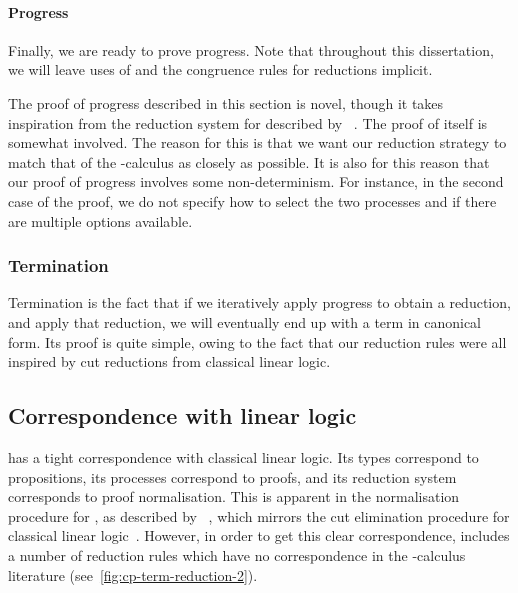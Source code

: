 \paragraph{Progress}
Finally, we are ready to prove progress.
Note that throughout this dissertation, we will leave uses of
\cpRedGammaEquiv and the congruence rules for reductions implicit.

The proof of progress described in this section is novel, though it takes
inspiration from the reduction system for \cp described by
\citeauthor{lindley2015semantics}~\cite{lindley2015semantics}. 
The proof of itself is somewhat involved. The reason for
this is that we want our reduction strategy to match that of the
\textpi-calculus as closely as possible.
It is also for this reason that our proof of progress involves some
non-determinism. For instance, in the second case of the proof, we do not
specify how to select the two processes  and  if there are
multiple options available.

\subsubsection{Termination}
Termination is the fact that if we iteratively apply progress to obtain a
reduction, and apply that reduction, we will eventually end up with a term in
canonical form.
Its proof is quite simple, owing to the fact that our reduction rules were all
inspired by cut reductions from classical linear logic.


\subsection{Correspondence with linear logic}\label{sec:cp-correspondence}
\cp has a tight correspondence with classical linear logic.
Its types correspond to propositions, its processes correspond to proofs, and
its reduction system corresponds to proof normalisation. 
This is apparent in the normalisation procedure for \cp, as described by
\citeauthor{wadler2012}~\cite{wadler2012}, which mirrors the cut elimination
procedure for classical linear logic~\cite{girard1987}.
However, in order to get this clear correspondence, \citeauthor{wadler2012}
includes a number of reduction rules which have no correspondence in the
\textpi-calculus literature (see~\cref{fig:cp-term-reduction-2}).


